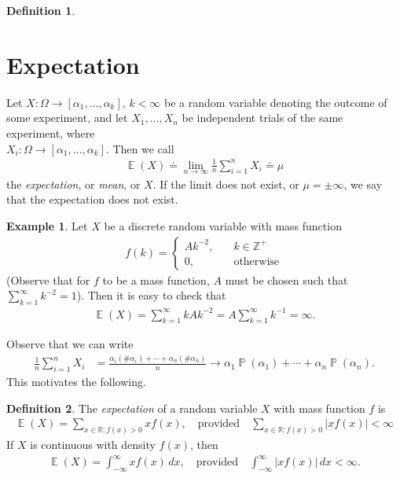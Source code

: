 \documentclass[12pt]{article}
\newcommand{\rr}{\mathbb{R}}
\newcommand{\zz}{\mathbb{Z}}
\DeclareMathOperator{\ex}{\mathbb{E}}
\DeclareMathOperator{\prob}{\mathbb{P}}
\theoremstyle{plain}
\theoremstyle{definition}
\newtheorem*{definition}{Definition}
\newtheorem*{example}{Example}
\theoremstyle{remark}
\numberwithin{equation}{section}  %
\begin{document}
\begin{definition}
	\section{Expectation}
	Let $X: \Omega \to [\alpha_1, \ldots, \alpha_k]$, $k < \infty$ be a random
	variable denoting the outcome of some experiment, and let $X_1, \ldots, 
	X_n$ be independent trials
	of the same experiment, where \\ $X_i:
	\Omega \to [\alpha_1, \ldots, \alpha_k]$. Then we 
	call
	\begin{align*}
		\ex(X) \doteq \lim_{n \to \infty} \frac{1}{n} \sum_{i =1}^n X_i \doteq 
		\mu 
	\end{align*}
	the \emph{expectation}, or \emph{mean}, or $X$. If the limit does not exist,
	or $\mu = \pm \infty$, we say that the expectation does not exist.
\end{definition}
\begin{example}
	Let $X$ be a discrete random variable with mass function 
	\begin{align*}
		f(k) = \begin{cases}
			A k^{-2},  \quad &k\in \zz^{+} 
			\\
			0, \quad & \text{otherwise}
		\end{cases}
	\end{align*}
	(Observe that for $f$ to be a mass function, $A$ must be chosen such that
	$\sum_{k = 1}^{\infty} k^{-2} = 1$).
	Then it is easy to check that
	\begin{align*}
		\ex(X) = \sum_{k=1}^{\infty} k A k^{-2} = A \sum_{k=1}^{\infty} k^{-1} = 
		\infty.
	\end{align*}

\end{example}
Observe that we can write
\begin{align*}
	\frac{1}{n} \sum_{i = 1}^n X_i
	& = \frac{\alpha_i (\#\alpha_i) + \cdots +
\alpha_n (\#\alpha_n)}{n}
\to \alpha_1 \prob(\alpha_1) + \cdots + \alpha_n \prob(\alpha_n).
\end{align*}
This motivates the following.
\begin{definition}
	The \emph{expectation} of a random variable $X$ with mass function $f$ is
	\begin{align*}
		\ex(X) = \sum_{x \in \rr: f(x) > 0} x f(x), \quad \text{provided} \quad
		\sum_{x \in \rr: f(x) > 0} |x
		f(x) | <
		\infty
	\end{align*}
	If $X$ is continuous with density $f(x)$, then
	\begin{align*}
		\ex(X) = \int_{-\infty}^{\infty} x f(x) \, dx, \quad \text{provided} \quad
		\int_{-\infty}^{\infty} |x f(x)| \, dx < \infty.
	\end{align*}
\end{definition}
\end{document}
